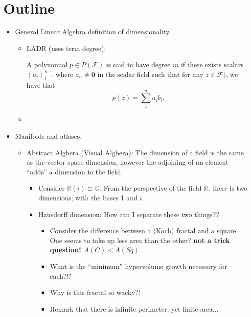 \documentclass{article}
\begin{document}
\section{Outline}
\begin{itemize}
		\item General Linear Algebra definition of dimensionality.
				\begin{itemize}
						\item LADR (uses term degree):
								
										A polynomial $p\in P(\mathcal{F})$ is said to have degree $m$ if there exists scalars $(a_i)_1^n$ -- where $a_n\neq \mathbf{0}$ in the scalar field such that for any $z\in\mathcal{F})$, we have that \[p(z)=\sum_{1}^n a_i b_i.\] 

						\item 
				\end{itemize}	
		\item Manifolds and atlases.
				\begin{itemize}
				\item Abstract Algbera (Visual Algbera): The dimension of a field is the same as the vector space dimension, however the adjoining of an element ``adds'' a dimension to the field.
						\begin{itemize}
								\item Consider $\mathbb{R}(i)\cong \mathbb{C}$. From the perspective of the field $\mathbb{R}$, there is two dimensions; with the bases 1 and $i$.
						\end{itemize}
				\begin{itemize}
						\item Hausdorff dimension: How can I separate these two things??
								\begin{itemize}
										\item Consider the difference between a (Koch) fractal and a square. One seems to take up less area than the other?
												\textbf{not a trick question! $A(C)<A(Sq)$}.
																						\item What is the ``minimum'' hypervolume growth necessary for each?!?
												\item Why is this fractal so wacky?!
																														\item Remark that there is infinite perimeter, yet finite area...
														
								\end{itemize}	
				\end{itemize}	
		\end{itemize}	
\end{itemize}	
\end{document}
